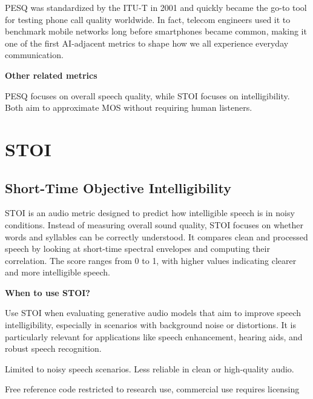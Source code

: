 {PESQ was standardized by the ITU-T in 2001 and quickly became the go-to tool for testing phone call quality worldwide. 
In fact, telecom engineers used it to benchmark mobile networks long before smartphones became common, making it one of the
first AI-adjacent metrics to shape how we all experience everyday communication.}

\textbf{Other related metrics}

PESQ focuses on overall speech quality, while STOI focuses on intelligibility. Both aim to approximate MOS without requiring human listeners.

\clearpage
\thispagestyle{genaistyle}
\section{STOI}
\subsection{Short-Time Objective Intelligibility}



STOI is an audio metric designed to predict how intelligible speech is in noisy conditions. Instead of measuring overall sound quality,
STOI focuses on whether words and syllables can be correctly understood. It compares clean and processed speech by looking at short-time
spectral envelopes and computing their correlation. The score ranges from 0 to 1, with higher values indicating clearer and more
intelligible speech.

\textbf{When to use STOI?}

Use STOI when evaluating generative audio models that aim to improve speech intelligibility, especially in scenarios with background noise
or distortions. It is particularly relevant for applications like speech enhancement, hearing aids, and robust speech recognition.

{
\item Limited to noisy speech scenarios. Less reliable in clean or high-quality audio.
\item Free reference code restricted to research use, commercial use requires licensing
}

